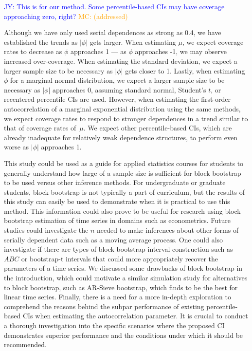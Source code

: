\documentclass[10pt]{article}
\newcommand{\jy}[1]{\textcolor{blue}{JY: #1}}
\newcommand{\mc}[1]{\textcolor{orange}{MC: (#1)}}
\begin{document}
\jy{This is for our method. Some percentile-based CIs may have coverage
  approaching zero, right?}
\mc{addressed}
  
Although
we have only used serial dependences as strong as 0.4, we have established the 
trends as $|\phi|$ gets larger. When estimating $\mu$, we expect coverage rates 
to decrease as
$\phi$ approaches 1 --- as $\phi$ approaches -1, we may observe increased 
over-coverage. When estimating the standard deviation, we expect a larger sample 
size to
be necessary as $|\phi|$ gets closer to 1. Lastly, when estimating $\phi$ for
a marginal normal distribution, we 
expect a larger sample size to be necessary as $|\phi|$ approaches 0, assuming
standard normal, Student's $t$, or 
recentered percentile CIs are used. However, 
when estimating the first-order autocorrelation of a marginal exponential 
distribution using the same methods, we expect coverage rates to 
respond
to stronger dependences in a trend similar to that of coverage rates of~$\mu$. 
We expect other percentile-based CIs, which are already inadequate for 
relatively weak
dependence structures, to perform even worse as $|\phi|$ approaches 1.


This study could be used as a guide for applied statistics courses for students
to generally understand how large of a sample size is sufficient for block
bootstrap to be used versus other inference methods. For undergraduate or 
graduate students, block bootstrap is not typically a part of curriculum, but
the results of this study can easily be used to demonstrate when it is practical 
to use this method. This information could also prove to be useful for research 
using block bootstrap estimation of time series in domains such as econometrics. 
Future studies could investigate the $n$ needed to make inferences about other 
forms of serially dependent data such as a moving average process. One could 
also investigate if there are types of block bootstrap interval construction 
such as $ABC$ or bootstrap-t intervals \citep{efron1993introduction} that could 
more
appropriately recover the parameters of a time series. We discussed some
drawbacks of block bootstrap in the introduction, which could motivate a similar
simulation study for alternatives to block bootstrap, such 
as AR-Sieve bootstrap, \citep{kreiss1992bootstrap} which 
\citet{buhlmann2002bootstraps} finds to be the best for linear time series.
Finally, there is a need for a more in-depth exploration to comprehend
the reasons behind the subpar performance of existing percentile-based
CIs when estimating the autocorrelation parameter. It is crucial to
conduct a thorough investigation into the specific scenarios where the
proposed CI demonstrates superior performance and the conditions under
which it should be recommended.
\end{document}
